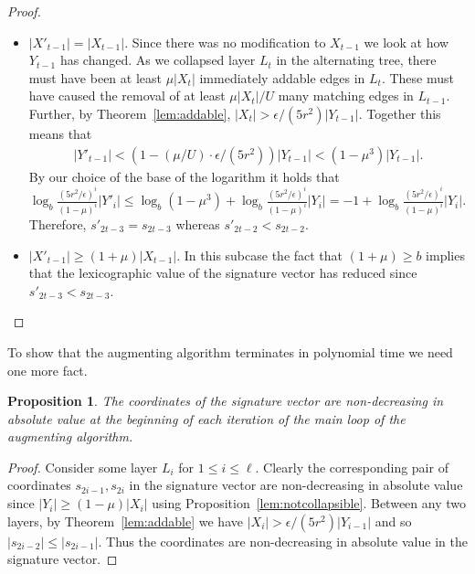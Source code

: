 \documentclass[11pt]{article}
\newtheorem{proposition}[theorem]{Proposition}
\theoremstyle{definition}
\theoremstyle{remark}
\begin{document}
\begin{proof}
\begin{itemize}
\begin{itemize}
\item $|X'_{t-1}| = |X_{t-1}|.$ Since there was no modification to $X_{t-1}$ we look at how $Y_{t-1}$ has changed. As we collapsed layer $L_t$ in the alternating tree, there must have been at least $\mu |X_t|$ immediately addable edges in $L_t$. These must have caused the removal of at least $\mu|X_t|/U$ many matching edges in $L_{t-1}$. Further, by Theorem~\ref{lem:addable}, $|X_t| > \epsilon/(5r^2) |Y_{t-1}|$. Together this means that 
\begin{align*}
|Y'_{t-1}| < (1-(\mu/U) \cdot \epsilon/(5r^2))|Y_{t-1}| < (1-\mu^3)|Y_{t-1}|.
\end{align*} By our choice of the base of the logarithm it holds that $\log_b \frac{(5r^2/\epsilon)^i}{(1-\mu)^i} |Y'_i| \leq \log_b (1-\mu^3) + \log_b \frac{(5r^2/\epsilon)^i}{(1-\mu)^i} |Y_i| = -1 + \log_b \frac{(5r^2/\epsilon)^i}{(1-\mu)^i} |Y_i|$. Therefore,  $s'_{2t-3} = s_{2t-3}$ whereas $s'_{2t-2} < s_{2t-2}$.

\item $|X'_{t-1}| \geq (1+\mu)|X_{t-1}|.$ In this subcase the fact that $(1+\mu) \geq b$ implies that the lexicographic value of the signature vector has reduced since $s'_{2t-3} < s_{2t-3}$.
\end{itemize}
  \end{itemize}
\end{proof}

To show that the augmenting algorithm terminates in polynomial time we need one more fact.

\begin{proposition}\label{lem:nondecreasing}
  The coordinates of the signature vector are non-decreasing in absolute value at the beginning of each iteration of the main loop of the augmenting algorithm.
\end{proposition}
\begin{proof}
  Consider some layer $L_i$ for $1 \leq i \leq \ell$. Clearly the corresponding pair of coordinates $s_{2i-1},s_{2i}$ in the signature vector are non-decreasing in absolute value since $|Y_i| \geq (1-\mu)|X_i|$ using Proposition~\ref{lem:notcollapsible}. Between any two layers, by Theorem~\ref{lem:addable} we have $|X_i| > \epsilon/(5r^2) |Y_{i-1}|$ and so $|s_{2i-2}| \leq |s_{2i-1}|$. Thus the coordinates are non-decreasing in absolute value in the signature vector.
\end{proof}
\end{document}
